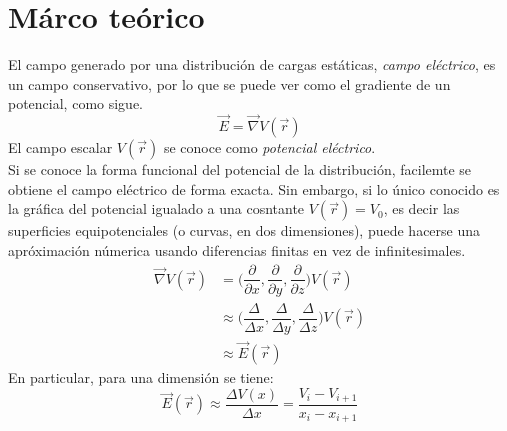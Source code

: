 \documentclass[10pt,twocolumn]{article}
\begin{document}
\section{Márco teórico}
El campo generado por una distribución de cargas estáticas, \emph{campo eléctrico}, es un campo conservativo, por lo que se puede ver como el gradiente de un potencial, como sigue. \cite{griffiths}
\begin{equation}\label{gradiente}
  \vec{E}=\vec{\nabla}V(\vec{r})
\end{equation}
El campo escalar $V(\vec{r})$ se conoce como \emph{potencial eléctrico}.\\
Si se conoce la forma funcional del potencial de la distribución, facilemte se obtiene el campo eléctrico de forma exacta. Sin embargo, si lo único conocido es la gráfica del potencial igualado a una cosntante $V(\vec{r})=V_0$, es decir las superficies equipotenciales (o curvas, en dos dimensiones), puede hacerse una apróximación númerica usando diferencias finitas en vez de infinitesimales.
\begin{equation*}
  \begin{split}
    \vec{\nabla}V(\vec{r})&=\Big(\dfrac{\partial}{\partial x}, \dfrac{\partial}{\partial y},
    \dfrac{\partial}{\partial z}\Big) V(\vec{r})\\
    &\approx \Big(\dfrac{\Delta}{\Delta x}, \dfrac{\Delta}{\Delta y}, \dfrac{\Delta}{\Delta z}\Big) V(\vec{r})\\
    &\approx \vec{E}(\vec{r})
  \end{split}
\end{equation*}
En particular, para una dimensión se tiene:
\begin{equation}\label{1dimension}
\vec{E}(\vec{r}) \approx \dfrac{\Delta V(x)}{\Delta x}=\dfrac{V_i-V_{i+1}}{x_i-x_{i+1}}  
\end{equation}
\end{document}
